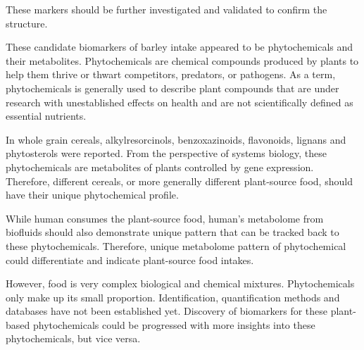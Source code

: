 These markers should be further investigated and validated to confirm the structure.

These candidate biomarkers of barley intake appeared to be phytochemicals and their metabolites. 
Phytochemicals are chemical compounds produced by plants to help them thrive or thwart competitors, predators, or pathogens.
As a term, phytochemicals is generally used to describe plant compounds that are under research with unestablished effects on health and are not scientifically defined as essential nutrients.

In whole grain cereals, alkylresorcinols, benzoxazinoids, flavonoids, lignans and phytosterols were reported\cite{Koistinen2017}. From the perspective of systems biology, these phytochemicals are metabolites of plants controlled by gene expression. Therefore, different cereals, or more generally different plant-source food, should have their unique phytochemical profile. 

While human consumes the plant-source food, human's metabolome from biofluids  should also demonstrate unique pattern that can be tracked back to these phytochemicals. Therefore, unique metabolome pattern of phytochemical could differentiate and indicate plant-source food intakes. 

However, food is very complex biological and chemical mixtures. Phytochemicals only make up its small proportion. Identification, quantification methods and databases have not been established yet. Discovery of biomarkers for these plant-based phytochemicals could be progressed with more insights into these phytochemicals, but vice versa.